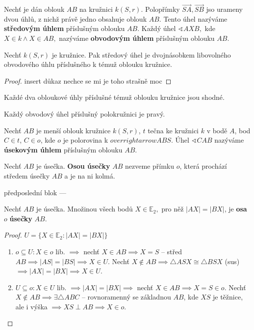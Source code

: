\begin{definition}
  Nechť je dán oblouk $AB$ na kružnici $k(S,r).$ Polopřímky $\overrightarrow{SA}, \overrightarrow{SB}$ jso urameny dvou úhlů, z nichž právě jedno obsahuje oblouk $AB$. Tento úhel nazýváme \textbf{středovým úhlem} příslušným oblouku $AB$. Každý úhel $\sphericalangle AXB,$ kde $X\in k \land X\in AB,$ nazýváme \textbf{obvodovým úhlem} příslušným oblouku $AB$.
\end{definition}

\begin{veta}
  Nechť $k(S,r)$ je kružnice. Pak středový úhel je dvojnásobkem libovolného obvodového úhlu příslušného k témuž oblouku kružnice.
\end{veta}


\begin{proof}
  insert důkaz nechce se mi je toho strašně moc
\end{proof}


\begin{veta}
  Každé dva obloukové úhly příslušné témuž oblouku kružnice jsou shodné.
\end{veta}


\begin{veta}[Thaletova]
  Každý obvodový úhel příslušný polokružnici je pravý.
\end{veta}

\begin{definition}
  Nechť $AB$ je menší oblouk kružnice $k(S,r)$, $t$ tečna ke kružnici $k$ v bodě $A$, bod $C\in t$, $C\in o$, kde $o$ je polorovina k $overrightarrow{ABS}.$ Úhel $\sphericalangle CAB$ nazýváme \textbf{úsekovým úhlem} příslušným oblouku $AB$.
\end{definition}


\begin{definition}
  Nechť $AB$ je úsečka. \textbf{Osou úsečky} $AB$ nezveme přímku $o$, která prochází středem úsečky $AB$ a je na ni kolmá.
\end{definition}


předposlední blok ---
\begin{veta}\label{mbdv}
  Nechť $AB$ je úsečka. Množinou všech bodů $X\in \mathbb E_2,$ pro něž $|AX|=|BX|$, je \textbf{osa} $o$ \textbf{úsečky} $AB$.
\end{veta}

\begin{proof}
  $U=\{ X\in \mathbb E_2: |AX|=|BX| \}$
  \begin{enumerate}[$i.$]
    \item $o \subseteq U: X \in o$ lib. $\implies$ nechť $X\in AB \implies X=S$ -- střed $AB \implies |AS|=|BS| \implies X \in U.$ Nechť $X \notin AB \implies \triangle ASX \cong \triangle BSX$ (sus) $\implies |AX|=|BX| \implies X \in U$.
    \item $U \subseteq o: X \in U$ lib. $\implies |AX|=|BX| \implies$ nechť $X \in AB \implies X=S \in o.$ Nechť $X \notin AB \implies \exists \triangle ABC$ -- rovnoramenný se základnou $AB$, kde $XS$ je těžnice, ale i výška $\implies XS \perp AB \implies X \in o.$ \qedhere
  \end{enumerate}
\end{proof}

